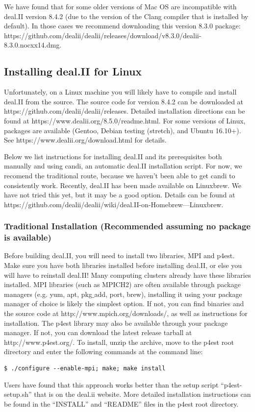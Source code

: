 \documentclass[10pt]{article} %
\begin{document}
We have found that for some older versions of Mac OS are incompatible with deal.II version 8.4.2 (due to the version of the Clang compiler that is installed by default). In those cases we recommend downloading this version 8.3.0 package:
\\ https://github.com/dealii/dealii/releases/download/v8.3.0/dealii-8.3.0.nocxx14.dmg.

\subsection{Installing deal.II for Linux}
Unfortunately, on a Linux machine you will likely have to compile and install deal.II from the source. The source code for version 8.4.2 can be downloaded at https://github.com/dealii/dealii/releases. Detailed installation directions can be found at https://www.dealii.org/8.5.0/readme.html. For some versions of Linux, packages are available (Gentoo, Debian testing (stretch), and Ubuntu 16.10+). See https://www.dealii.org/download.html for details.

Below we list instructions for installing deal.II and its prerequisites both manually and using candi, an automatic deal.II installation script. For now, we recomend the traditional route, because we haven't been able to get candi to consistently work. Recently, deal.II has been made available on Linuxbrew. We have not tried this yet, but it may be a good option. Details can be found at https://github.com/dealii/dealii/wiki/deal.II-on-Homebrew---Linuxbrew.

\subsubsection{Traditional Installation (Recommended assuming no package is available)}
Before building deal.II, you will need to install two libraries, MPI and p4est. Make sure you have both libraries installed before installing deal.II, or else you will have to reinstall deal.II! Many computing clusters already have these libraries installed. MPI libraries (such as MPICH2) are often available through package managers (e.g. yum, apt, pkg$\_$add, port, brew), installing it using your package manager of choice is likely the simplest option. If not, you can find binaries and the source code at http://www.mpich.org/downloads/, as well as instructions for installation. The p4est library may also be available through your package manager. If not, you can download the latest release tarball at http://www.p4est.org/. To install, unzip the archive, move to the p4est root directory and enter the following commands at the command line:
\begin{lstlisting}
$ ./configure --enable-mpi; make; make install
\end{lstlisting}
Users have found that this approach works better than the setup script ``p4est-setup.sh'' that is on the deal.ii website. More detailed installation instructions can be found in the ``INSTALL'' and ``README'' files in the p4est root directory.
\end{document}
